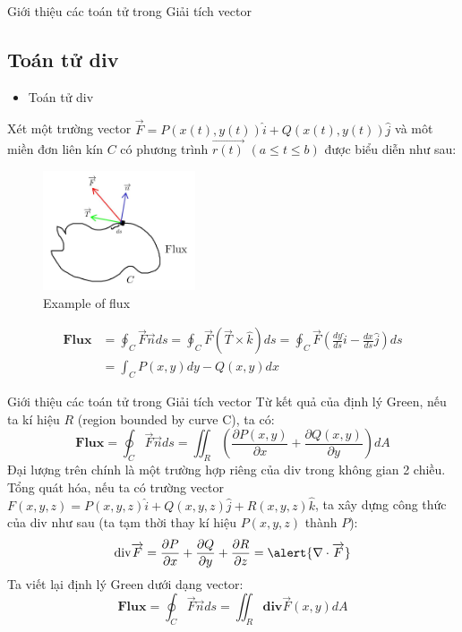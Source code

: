 \documentclass[8pt]{beamer}
\begin{document}
\begin{frame}{Giới thiệu các toán tử trong Giải tích vector}
\subsection{Toán tử div}
\begin{itemize}
	\item Toán tử div
\end{itemize}
Xét một trường vector $\overrightarrow{F}=P(x(t),y(t))\hat i+Q(x(t),y(t))\hat j$ và môt miền đơn liên kín $C$ có phương trình $\overrightarrow{r(t)}$ $(a\leq t\leq b)$ được biểu diễn như sau:

\begin{figure}[h]
			\includegraphics[width=0.4\textwidth]{flux.jpg}
			\caption{Example of flux}			\label{fig:re4}
\end{figure}
\begin{equation*}
\begin{split}
	\textbf{Flux}&=\oint_{C}\overrightarrow{F}\overrightarrow{n}ds=\oint_{C}\overrightarrow{F}(\overrightarrow{T}\times \hat k)ds=\oint_{C}\overrightarrow{F}\left(\frac{dy}{ds}\hat i-\frac{dx}{ds}\hat j\right)ds\\&=\int_{C}P(x,y)dy-Q(x,y)dx
\end{split}
\end{equation*}
\end{frame}
\begin{frame}{Giới thiệu các toán tử trong Giải tích vector}
Từ kết quả của định lý Green, nếu ta kí hiệu $R$ (region bounded by curve C), ta có:
\begin{equation*}
	\textbf{Flux}=\oint_{C}\overrightarrow{F}\overrightarrow{n}ds=\iint_{R}\left(\frac{\partial P(x,y)}{\partial x}+\frac{\partial Q(x,y)}{\partial y}\right)dA
\end{equation*}
Đại lượng trên chính là một trường hợp riêng của div trong không gian 2 chiều. Tổng quát hóa, nếu ta có trường vector $F(x,y,z)=P(x,y,z)\hat i + Q(x,y,z)\hat j + R(x,y,z)\hat k$, ta xây dựng công thức của div như sau (ta tạm thời thay kí hiệu $P(x,y,z)$ thành $P$):
$$\text{div}\overrightarrow{F}=\frac{\partial P}{\partial x}+\frac{\partial Q}{\partial y}+\frac{\partial R}{\partial z}=\alert{\nabla\cdot \overrightarrow{F}}$$
Ta viết lại định lý Green dưới dạng vector:
$$\textbf{Flux}=\oint_{C}\overrightarrow{F}\overrightarrow{n}ds=\iint_{R}\textbf{div}\overrightarrow{F}(x,y)dA$$
\end{frame}
\end{document}
